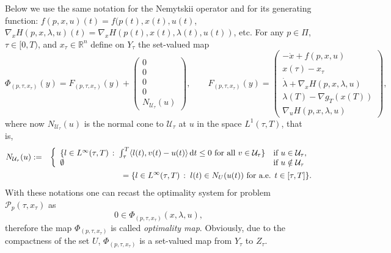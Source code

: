 \documentclass[11pt]{article}
\newcommand{\bd}{\begin{displaymath}}
\newcommand{\ed}{\end{displaymath}}
\newcommand{\bda}{\begin{eqnarray*}}
\newcommand{\eda}{\end{eqnarray*}}
\newcommand{\R}{\mathbb R}
\newcommand{\U}{\mathcal U}
\newcommand{\sth}{ \, :\;}
\newcommand{\dd}{\mbox{\rm\,d}}
\renewcommand{\lll}{\langle}
\newcommand{\rrr}{\rangle}
\newcommand{\p}{{\mathcal P}}
\def\R{\mathbb{R}}
\begin{document}
Below we use the same notation for the Nemytskii operator and for its generating function:
$f(p,x,u)(t) = f(p(t),x(t),u(t)$, $\nabla_{\!\! x} H(p,x,\lambda,u)(t) = \nabla_{\!\! x} H(p(t),x(t),\lambda(t),u(t))$, etc.
For any $p \in \varPi$, $\tau \in [0,T)$, and $x_\tau \in \R^n$ define on $Y_\tau$ the set-valued map
\bd %
   \Phi_{(p,\tau,x_\tau)}(y) = F_{(p,\tau,x_\tau)}(y) + \left( \begin{array}{c}
                                                      0 \\
                                                       0 \\
                                                      0 \\
                                                      0\\
                                                   N_{\U_\tau}(u) 
                                 \end{array} \right),
                \qquad  F_{(p,\tau,x_\tau)}(y) = \left( \begin{array}{c}
                                            - \dot x + f(p,x,u)   \\
                                            x(\tau) - x_\tau \\
                                             \dot \lambda + \nabla_{\!\! x} H(p,x,\lambda,u) \\
                                             \lambda(T)-\nabla g_T(x(T))\\
                                        \nabla_{\!\!u} H(p,x,\lambda,u) 
                                         \end{array} \right),
\ed
where now $N_{\U_\tau}(u)$ is the normal cone to $\U_\tau$ at $u$ in the space $L^1(\tau, T)$, that is,
\bda
     N_{\U_\tau}(u) &:=& \left\{ \begin{array}{ll} \{l \in L^\infty(\tau,T)  \sth \int_\tau^T \lll l(t), v(t) -u(t) \rrr \dd t 
     \leq 0 {\text{ for all } v \in \U_\tau}\} & {\text{if } u \in \U_\tau,}\\
             \emptyset & \text{if } u \notin \U_\tau\end{array}\right. \\
    && = \{ l \in L^\infty(\tau,T) \sth l(t) \in N_U(u(t)) \mbox{ for a.e. } t \in [\tau, T] \}.
\eda
With these notations one can recast the optimality system for problem  $\p_p(\tau,x_\tau)$ as
\bd
          0 \in \Phi_{(p,\tau,x_\tau)}(x,\lambda,u),
\ed 
therefore the map $\Phi_{(p,\tau, x_\tau)}$ is called {\em optimality map}. Obviously, due to the compactness 
of the set $U$,  $\Phi_{(p,\tau,x_\tau)}$ is a set-valued map from  $Y_\tau$ to $Z_\tau$.
\end{document}
